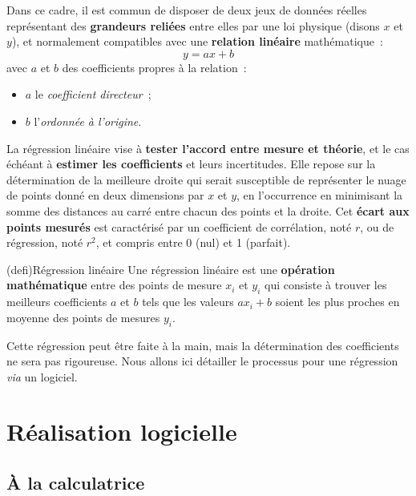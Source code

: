 \documentclass[a4paper, 12pt, garamond]{book}
\begin{document}
Dans ce cadre, il est commun de disposer de deux jeux de données réelles
représentant des \textbf{grandeurs reliées} entre elles par une
loi physique (disons $x$ et $y$), et normalement compatibles avec une
\textbf{relation linéaire} mathématique~:
\[
	\boxed{y = ax+b}
\]
avec $a$ et $b$ des coefficients propres à la relation~:
\begin{itemize}
	\item $a$ le \textit{coefficient directeur}~;
	\item $b$ l'\textit{ordonnée à l'origine}.
\end{itemize}

La régression linéaire vise à \textbf{tester l'accord entre mesure
  et théorie}, et le cas échéant à \textbf{estimer les coefficients} et leurs
incertitudes. Elle repose sur la détermination de la meilleure droite qui serait
susceptible de représenter le nuage de points donné en deux dimensions par $x$
et $y$, en l'occurrence en minimisant la somme des distances au carré entre
chacun des points et la droite. Cet \textbf{écart aux points mesurés} est
caractérisé par un coefficient de corrélation, noté $r$, ou de régression, noté
$r^{2}$, et compris entre 0 (nul) et 1 (parfait).

\begin{tcn}(defi){Régression linéaire}
  Une régression linéaire est une \textbf{opération mathématique} entre des
  points de mesure $x_i$ et $y_i$ qui consiste à trouver les meilleurs
  coefficients $a$ et $b$ tels que les valeurs $ax_i+b$ soient les plus proches
  en moyenne des points de mesures $y_i$.
\end{tcn}

Cette régression peut être faite à la main, mais la détermination des
coefficients ne sera pas rigoureuse. Nous allons ici détailler le processus pour
une régression \textit{via} un logiciel.

\section{Réalisation logicielle}

\subsection{À la calculatrice}
\end{document}
